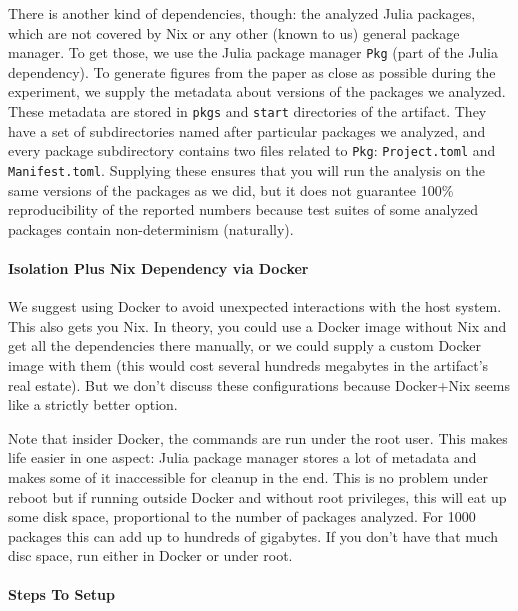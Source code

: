 \documentclass[
]{article}
\begin{document}
There is another kind of dependencies, though: the analyzed Julia
packages, which are not covered by Nix or any other (known to us)
general package manager. To get those, we use the Julia package manager
\texttt{Pkg} (part of the Julia dependency). To generate figures from
the paper as close as possible during the experiment, we supply the
metadata about versions of the packages we analyzed. These metadata are
stored in \texttt{pkgs} and \texttt{start} directories of the artifact.
They have a set of subdirectories named after particular packages we
analyzed, and every package subdirectory contains two files related to
\texttt{Pkg}: \texttt{Project.toml} and \texttt{Manifest.toml}.
Supplying these ensures that you will run the analysis on the same versions of
the packages as we did, but it does not guarantee 100\% reproducibility of
the reported numbers because test suites of some analyzed packages contain
non-determinism (naturally).

\hypertarget{isolation-plus-nix-dependency-via-docker}{%
\paragraph{Isolation Plus Nix Dependency via
Docker}\label{isolation-plus-nix-dependency-via-docker}}

We suggest using Docker to avoid unexpected interactions with the host
system. This also gets you Nix. In theory, you could use a Docker image
without Nix and get all the dependencies there manually, or we could supply
a custom Docker image with them (this would cost several hundreds
megabytes in the artifact's real estate). But we don't discuss these
configurations because Docker+Nix seems like a strictly better option.

Note that insider Docker, the commands are run under the root user. This
makes life easier in one aspect: Julia package manager stores a lot of
metadata and makes some of it inaccessible for cleanup in the end. This
is no problem under reboot but if running outside Docker and without root
privileges, this will eat up some disk space, proportional to the number
of packages analyzed. For 1000 packages this can add up to hundreds of
gigabytes. If you don't have that much disc space, run either in Docker
or under root.

\hypertarget{steps-to-setup}{%
\paragraph{Steps To Setup}\label{steps-to-setup}}
\end{document}
